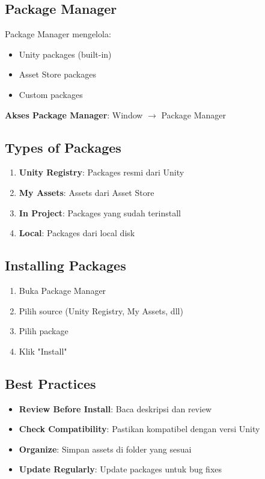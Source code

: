 \subsection{Package Manager}

Package Manager mengelola:
\begin{itemize}
\item Unity packages (built-in)
\item Asset Store packages
\item Custom packages
\end{itemize}

\textbf{Akses Package Manager}: Window $\rightarrow$ Package Manager

\subsection{Types of Packages}

\begin{enumerate}
\item \textbf{Unity Registry}: Packages resmi dari Unity
\item \textbf{My Assets}: Assets dari Asset Store
\item \textbf{In Project}: Packages yang sudah terinstall
\item \textbf{Local}: Packages dari local disk
\end{enumerate}

\subsection{Installing Packages}

\begin{enumerate}
\item Buka Package Manager
\item Pilih source (Unity Registry, My Assets, dll)
\item Pilih package
\item Klik "Install"
\end{enumerate}

\subsection{Best Practices}

\begin{itemize}
\item \textbf{Review Before Install}: Baca deskripsi dan review
\item \textbf{Check Compatibility}: Pastikan kompatibel dengan versi Unity
\item \textbf{Organize}: Simpan assets di folder yang sesuai
\item \textbf{Update Regularly}: Update packages untuk bug fixes
\end{itemize}

